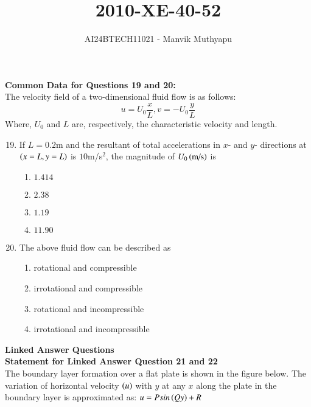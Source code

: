 \documentclass[journal,12pt,onecolumn]{IEEEtran}
\title{2010-XE-40-52}
\author{AI24BTECH11021 - Manvik Muthyapu}
\theoremstyle{remark}
\begin{document}

\maketitle
\bigskip

\renewcommand{\thefigure}{\theenumi}
\renewcommand{\thetable}{\theenumi}

\textbf{Common Data for Questions 19 and 20:}\\

The velocity field of a two-dimensional fluid flow is as follows:
$$u=U_{0}\frac{x}{L}, v=-U_{0}\frac{y}{L}$$
Where, $U_{0}$ and $L$ are, respectively, the characteristic velocity and length.

\begin{enumerate}
\setcounter{enumi}{18}
\item If $L=0.2$m and the resultant of total accelerations in $x$- and $y$- directions at $\left(x=L ,y=L\right)$ is $10$m/s$^2$, the magnitude of $U_{0}\left(\text{m/s}\right)$ is

\begin{enumerate}
	\item $1.414$
	\item $2.38$
	\item $1.19$
	\item $11.90$
\end{enumerate}

\item The above fluid flow can be described as

\begin{enumerate}
	\item rotational and compressible
	\item irrotational and compressible
	\item rotational and incompressible
	\item irrotational and incompressible\\
\end{enumerate}

\end{enumerate}

\textbf{Linked Answer Questions}\\

\textbf{Statement for Linked Answer Question 21 and 22}\\

The boundary layer formation over a flat plate is shown in the figure below. The variation of horizontal velocity $\left(u\right)$ with $y$ at any $x$ along the plate in the boundary layer is approximated as: $u=Psin\left(Qy\right)+R$
\end{document}
